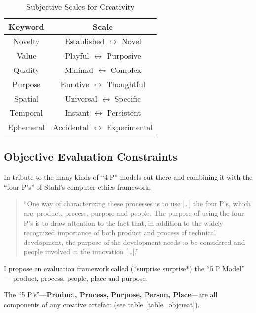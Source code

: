\begin{table}
\centering
  \begin{tabu}{cc}
  \toprule
  \textbf{Keyword} & \textbf{Scale} \\
  \midrule
  Novelty & Established $\leftrightarrow$ Novel \\
  Value & Playful $\leftrightarrow$ Purposive \\
  Quality & Minimal $\leftrightarrow$ Complex \\
  Purpose & Emotive $\leftrightarrow$ Thoughtful \\
  Spatial & Universal $\leftrightarrow$ Specific \\
  Temporal & Instant $\leftrightarrow$ Persistent \\
  Ephemeral & Accidental $\leftrightarrow$ Experimental \\
  \bottomrule
  \end{tabu}
\caption[Subjective Scales for Creativity]{Subjective Scales for Creativity}
\label{table_subcreat}
\end{table}


\subsection{Objective Evaluation Constraints}

In tribute to the many kinds of ``4 P'' models out there and combining it with the ``four P's'' of Stahl's computer ethics framework.

\begin{quote}
  ``One way of characterizing these processes is to use [\ldots] the four P's, which are: product, process, purpose and people. The purpose of using the four P's is to draw attention to the fact that, in addition to the widely recognized importance of both product and process of technical development, the purpose of the development needs to be considered and people involved in the innovation [\ldots].'' 
\end{quote}

I propose an evaluation framework called (*surprise surprise*) the ``5 P Model'' --- product, process, people, place and purpose.



The ``5 P's''---\textbf{Product, Process, Purpose, Person, Place}---are all components of any creative artefact (see table~\ref{table_objcreat}).

